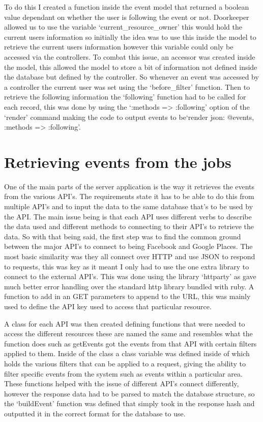 		To do this I created a function inside the event model that returned a boolean value dependant on whether the user is following the event or not. Doorkeeper allowed us to use the variable `current\_resource\_owner' this would hold the current users information so initially the idea was to use this inside the model to retrieve the current users information however this variable could only be accessed via the controllers. To combat this issue,  an accessor was created inside the model, this allowed the model to store a bit of information not defined inside the database but defined by the controller. So whenever an event was accessed by a controller the current user was set using the `before\_filter' function. Then to retrieve the following information the `following' function had to be called for each record, this was done by using the `:methods => :following' option of the `render' command making the code to output events to be`render json: @events, :methods => :following'. 

	\section{Retrieving events from the jobs}
		One of the main parts of the server application is the way it retrieves the events from the various API's. The requirements state it has to be able to do this from multiple API's and to input the data to the same database that's to be used by the API. The main issue being is that each API uses different verbs to describe the data used and different methods to connecting to their API's to retrieve the data. So with that being said, the first step was to find the common ground between the major API's to connect to being Facebook and Google Places. The most basic similarity was they all connect over HTTP and use JSON to respond to requests, this was key as it meant I only had to use the one extra library to connect to the external API's. This was done using the library `httparty' as gave much better error handling over the standard http library bundled with ruby. A function to add in an GET parameters to append to the URL, this was mainly used to define the API key used to access that particular resource. 

		A class for each API was then created defining functions that were needed to access the different resources these are named the same and resembles what the function does such as getEvents got the events from that API with certain filters applied to them. Inside of the class a class variable was defined inside of which holds the various filters that can be applied to a request, giving the ability to filter specific events from the system such as events within a particular area. These functions helped with the issue of different API's connect differently, however the response data had to be parsed to match the database structure, so  the `buildEvent' function was defined that simply took in the response hash and outputted it in the correct format for the database to use. 

